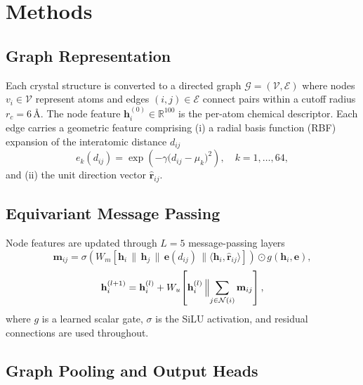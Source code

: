 \section{Methods}
\label{sec:methods}

\subsection{Graph Representation}

Each crystal structure is converted to a directed graph
$\mathcal{G}=(\mathcal{V},\mathcal{E})$ where nodes $v_i\in\mathcal{V}$
represent atoms and edges $(i,j)\in\mathcal{E}$ connect pairs
within a cutoff radius $r_c = 6$\,\AA.
The node feature $\mathbf{h}_i^{(0)}\in\mathbb{R}^{100}$ is the
per-atom chemical descriptor.
Each edge carries a geometric feature comprising
(i) a radial basis function (RBF) expansion of the interatomic
distance $d_{ij}$
\begin{equation}
  e_k(d_{ij}) = \exp\!\left(-\gamma\bigl(d_{ij}-\mu_k\bigr)^2\right),
  \quad k=1,\ldots,64,
\end{equation}
and (ii) the unit direction vector $\hat{\mathbf{r}}_{ij}$.

\subsection{Equivariant Message Passing}

Node features are updated through $L=5$ message-passing layers
\begin{equation}
  \mathbf{m}_{ij} = \sigma\!\left(
    W_m[\mathbf{h}_i\,\|\,\mathbf{h}_j\,\|\,\mathbf{e}(d_{ij})\,\|
    \langle\mathbf{h}_i,\hat{\mathbf{r}}_{ij}\rangle]
  \right) \odot g(\mathbf{h}_i,\mathbf{e}),
\end{equation}
\begin{equation}
  \mathbf{h}_i^{(l+1)} = \mathbf{h}_i^{(l)}
    + W_u\!\left[\mathbf{h}_i^{(l)}\,\Bigl\|
      \sum_{j\in\mathcal{N}(i)}\mathbf{m}_{ij}\right],
\end{equation}
where $g$ is a learned scalar gate, $\sigma$ is the SiLU activation,
and residual connections are used throughout.

\subsection{Graph Pooling and Output Heads}

